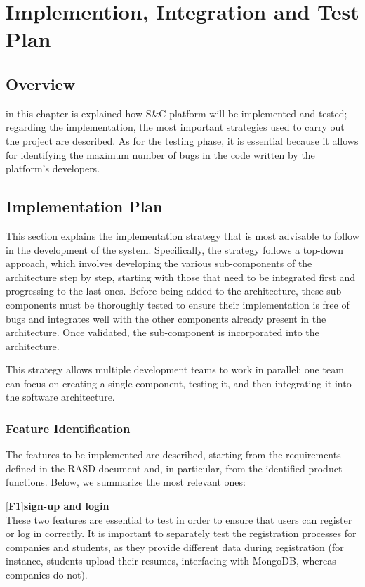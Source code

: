 \chapter{Implemention, Integration and Test Plan}

\section{Overview}
in this chapter is explained how S\&C platform will be implemented and tested; regarding the implementation, the most important strategies used to carry out the project are described. As for the testing phase, it is essential because it allows for identifying the maximum number of bugs in the code written by the platform's developers.

\section{Implementation Plan}
This section explains the implementation strategy that is most advisable to follow in the development of the system. Specifically, the strategy follows a top-down approach, which involves developing the various sub-components of the architecture step by step, starting with those that need to be integrated first and progressing to the last ones. 
Before being added to the architecture, these sub-components must be thoroughly tested to ensure their implementation is free of bugs and integrates well with the other components already present in the architecture. Once validated, the sub-component is incorporated into the architecture.

This strategy allows multiple development teams to work in parallel: one team can focus on creating a single component, testing it, and then integrating it into the software architecture.

\subsection{Feature Identification}
The features to be implemented are described, starting from the requirements defined in the RASD document and, in particular, from the identified product functions. Below, we summarize the most relevant ones:

[\textbf{F1}]\textbf{sign-up and login}\\
These two features are essential to test in order to ensure that users can register or log in correctly. It is important to separately test the registration processes for companies and students, as they provide different data during registration (for instance, students upload their resumes, interfacing with MongoDB, whereas companies do not).

